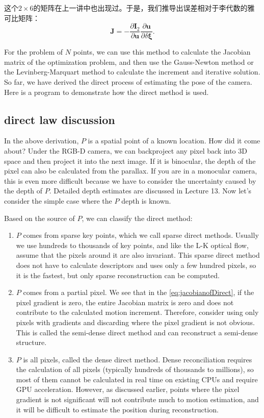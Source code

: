 这个$2 \times 6$的矩阵在上一讲中也出现过。于是，我们推导出误差相对于李代数的雅可比矩阵：
\begin{equation}
\label{eq:jacobianofDirect}
\bm{J} =  - \frac{{\partial { \bm{I}_2}}}{{\partial \bm{u}}}\frac{{\partial \bm{u}}}{{\partial \delta \bm{\xi} }}.
\end{equation}

For the problem of $N$ points, we can use this method to calculate the Jacobian matrix of the optimization problem, and then use the Gauss-Newton method or the Levinberg-Marquart method to calculate the increment and iterative solution. So far, we have derived the direct process of estimating the pose of the camera. Here is a program to demonstrate how the direct method is used.

\subsection{direct law discussion}
In the above derivation, $P$ is a spatial point of a known location. How did it come about? Under the RGB-D camera, we can backproject any pixel back into 3D space and then project it into the next image. If it is binocular, the depth of the pixel can also be calculated from the parallax. If you are in a monocular camera, this is even more difficult because we have to consider the uncertainty caused by the depth of $P$. Detailed depth estimates are discussed in Lecture 13. Now let's consider the simple case where the $P$ depth is known.

Based on the source of $P$, we can classify the direct method:
\begin{enumerate}
\item $P$ comes from sparse key points, which we call sparse direct methods. Usually we use hundreds to thousands of key points, and like the L-K optical flow, assume that the pixels around it are also invariant. This sparse direct method does not have to calculate descriptors and uses only a few hundred pixels, so it is the fastest, but only sparse reconstruction can be computed.
\item $P$ comes from a partial pixel. We see that in the \eqref{eq:jacobianofDirect}, if the pixel gradient is zero, the entire Jacobian matrix is ​​zero and does not contribute to the calculated motion increment. Therefore, consider using only pixels with gradients and discarding where the pixel gradient is not obvious. This is called the semi-dense direct method and can reconstruct a semi-dense structure.
\item $P$ is all pixels, called the dense direct method. Dense reconciliation requires the calculation of all pixels (typically hundreds of thousands to millions), so most of them cannot be calculated in real time on existing CPUs and require GPU acceleration. However, as discussed earlier, points where the pixel gradient is not significant will not contribute much to motion estimation, and it will be difficult to estimate the position during reconstruction.
\end{enumerate}

